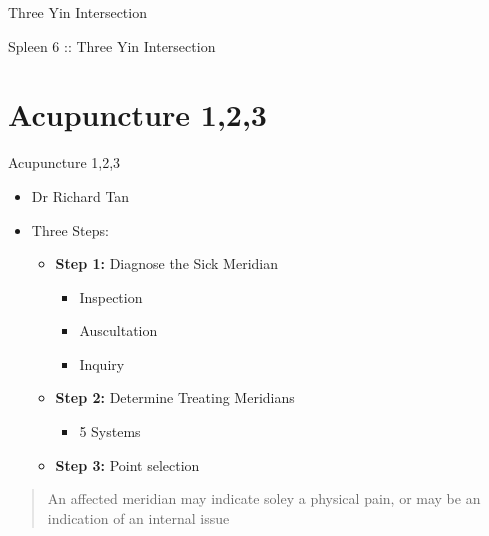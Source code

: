 \begin{frame}{Three Yin Intersection}

\large{Spleen 6 :: Three Yin Intersection}


\vspace{1em}



\end{frame}

\section{Acupuncture 1,2,3}

\begin{frame}{Acupuncture 1,2,3}
  \begin{itemize}
  \item Dr Richard Tan
  \item Three Steps:
    \begin{itemize} \itemsep1em
    \item \textbf{Step 1:} Diagnose the Sick Meridian
      \begin{itemize}
      \item Inspection
      \item Auscultation
      \item Inquiry
      \end{itemize}
    \item \textbf{Step 2:} Determine Treating Meridians
      \begin{itemize}
      \item{5 Systems}
      \end{itemize}
    \item \textbf{Step 3:} Point selection
    \end{itemize}
  \end{itemize}

  \begin{quote}
    An affected meridian may indicate soley a physical pain, or may be an indication of an internal issue
  \end{quote}
\end{frame}

